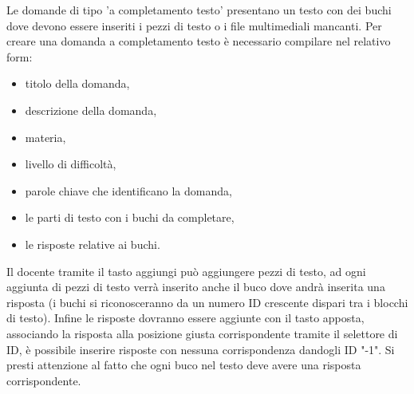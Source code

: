 \documentclass[a4paper, titlepage]{article}
\begin{document}
	 Le domande di tipo 'a completamento testo' presentano un testo con dei buchi dove devono essere inseriti i pezzi di testo o i file multimediali mancanti.
	 Per creare una domanda a completamento testo è necessario compilare nel relativo form:
	 \begin{itemize}
	 	\item titolo della domanda,
	 	\item descrizione della domanda,
	 	\item materia,
	 	\item livello di difficoltà,
	 	\item parole chiave che identificano la domanda,
	 	\item le parti di testo con i buchi da completare,
	 	\item le risposte relative ai buchi.
	 \end{itemize}
	 Il docente tramite il tasto aggiungi può aggiungere pezzi di testo, ad ogni aggiunta di pezzi di testo verrà inserito anche il buco dove andrà inserita una risposta (i buchi si riconosceranno da un numero ID crescente dispari tra i blocchi di testo). Infine le risposte dovranno essere aggiunte con il tasto apposta, associando la risposta alla posizione giusta corrispondente tramite il selettore di ID, è possibile inserire risposte con nessuna corrispondenza dandogli ID "-1". Si presti attenzione al fatto che ogni buco nel testo deve avere una risposta corrispondente.
	 
	 \newpage
\end{document}
